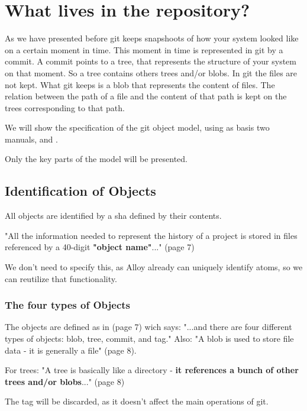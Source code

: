 \section{What lives in the repository?}

As we have presented before git keeps snapshoots of how your system
looked like on a certain moment in time. This moment in time is
represented in git by a commit. A commit points to a tree, that
represents the structure of your system on that moment. So a tree
contains others trees and/or blobs. In git the files are not kept. 
What git keeps is a blob that represents the content of files. The
relation between the path of a file and the content of that path 
is kept on the trees corresponding to that path.

We will show the 
specification of the git object model, using as
basis two manuals, \cite{gitComm} and \cite{progit}. \par
Only the key parts of the model will be presented. \par

\subsection{Identification of Objects}

All objects are identified by a sha defined by their contents. \par
"All the information needed to represent the history
of a project is stored in files referenced by a 
40-digit {\bf "object name"}..." (page 7) \par
We don't need to specify this, as Alloy already can uniquely
identify atoms, so we can reutilize that functionality. \par


\subsubsection{The four types of Objects}

The objects are defined as in \cite{gitComm} (page 7) wich says: 
"...and there are four different types of objects: blob,
tree, commit, and tag."
Also: "A blob is used to store file data - it is generally a file" 
\cite{gitComm} (page 8). \par
For trees: "A tree is basically like a directory 
- {\bf it references a bunch
of other trees and/or blobs}..." (page 8) \par 


The tag will be discarded, as it doesn't affect the main operations
of git. \par 

